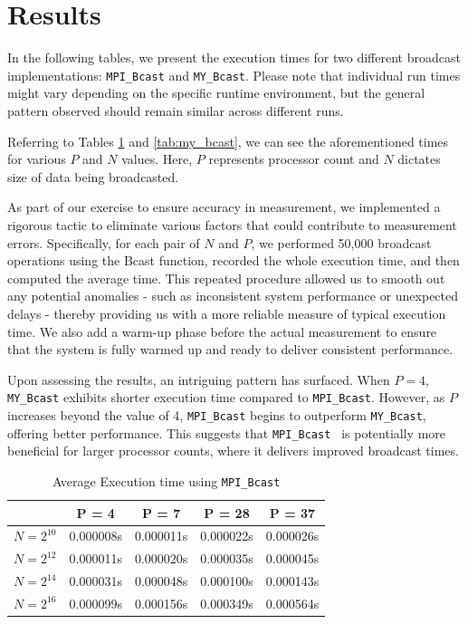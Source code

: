 \documentclass[12pt,a4paper]{article}
\begin{document}
  
  
\section{Results}
In the following tables, 
 we present the execution times for two different broadcast implementations: 
 \texttt{MPI\_Bcast} and \texttt{MY\_Bcast}. 
Please note that individual run times might vary depending on the specific runtime environment, 
but the general pattern observed should remain similar across different runs. 

Referring to Tables \ref{tab:mpi_bcast} and \ref{tab:my_bcast}, 
 we can see the aforementioned times for various $P$ and $N$ values.
Here, $P$ represents processor count and $N$ dictates size of data being 
broadcasted.

As part of our exercise to ensure accuracy in measurement, 
 we implemented a rigorous tactic to eliminate various factors that could 
 contribute to measurement errors. 
Specifically, for each pair of $N$ and $P$, 
 we performed 50,000 broadcast operations using the Bcast function,
 recorded the whole execution time, and then computed the average time. 
This repeated procedure allowed us to smooth out any potential anomalies - 
 such as inconsistent system performance or unexpected delays - 
 thereby providing us with a more reliable measure of typical execution time. 
We also add a warm-up phase before the actual measurement to ensure that 
 the system is fully warmed up and ready to deliver consistent performance.

Upon assessing the results, an intriguing pattern has surfaced. 
When $P=4$, \texttt{MY\_Bcast} exhibits shorter execution time compared to \texttt{MPI\_Bcast}. 
However, as $P$ increases beyond the value of 4, 
\texttt{MPI\_Bcast} begins to outperform \texttt{MY\_Bcast}, 
offering better performance. 
This suggests that \texttt{MPI\_Bcast } is potentially more beneficial for larger processor 
 counts, where it delivers improved broadcast times.

\begin{table}[!htb]
   \centering   
   \begin{tabular}{|c|c|c|c|c|}    
   \hline    
   & P = 4 & P = 7 & P = 28 & P = 37 \\   
   \hline    
   $N = 2^{10}$ & 0.000008s & 0.000011s & 0.000022s & 0.000026s \\   
   \hline    
   $N = 2^{12}$ & 0.000011s & 0.000020s & 0.000035s & 0.000045s \\  
   \hline    
   $N = 2^{14}$ & 0.000031s & 0.000048s & 0.000100s & 0.000143s \\   
   \hline    
   $N = 2^{16}$ & 0.000099s & 0.000156s & 0.000349s & 0.000564s \\   
   \hline    
   \end{tabular}    
   \caption{Average Execution time using \texttt{MPI\_Bcast}}    
   \label{tab:mpi_bcast}
\end{table}
\end{document}
